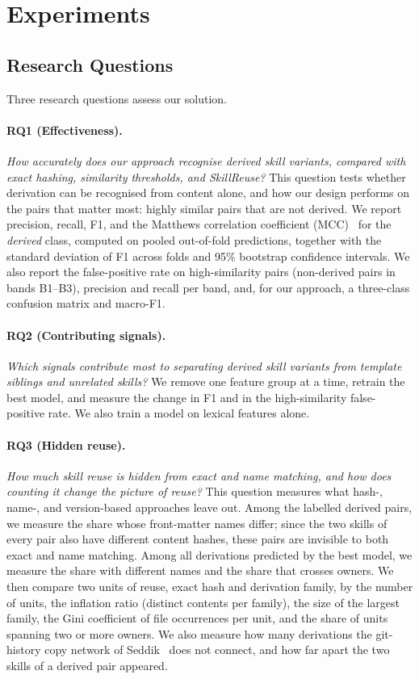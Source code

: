 \documentclass[sigconf,screen]{acmart}
\begin{document}
\section{Experiments}
\label{sec:experiments}

\subsection{Research Questions}

Three research questions assess our solution.

\paragraph{RQ1 (Effectiveness).} \emph{How accurately does our approach recognise derived skill variants, compared with exact hashing, similarity thresholds, and SkillReuse?} This question tests whether derivation can be recognised from content alone, and how our design performs on the pairs that matter most: highly similar pairs that are not derived. We report precision, recall, F1, and the Matthews correlation coefficient (MCC)~\cite{chicco2020mcc} for the \emph{derived} class, computed on pooled out-of-fold predictions, together with the standard deviation of F1 across folds and 95\% bootstrap confidence intervals. We also report the false-positive rate on high-similarity pairs (non-derived pairs in bands B1--B3), precision and recall per band, and, for our approach, a three-class confusion matrix and macro-F1.

\paragraph{RQ2 (Contributing signals).} \emph{Which signals contribute most to separating derived skill variants from template siblings and unrelated skills?} We remove one feature group at a time, retrain the best model, and measure the change in F1 and in the high-similarity false-positive rate. We also train a model on lexical features alone.

\paragraph{RQ3 (Hidden reuse).} \emph{How much skill reuse is hidden from exact and name matching, and how does counting it change the picture of reuse?} This question measures what hash-, name-, and version-based approaches leave out. Among the labelled derived pairs, we measure the share whose front-matter names differ; since the two skills of every pair also have different content hashes, these pairs are invisible to both exact and name matching. Among all derivations predicted by the best model, we measure the share with different names and the share that crosses owners. We then compare two units of reuse, exact hash and derivation family, by the number of units, the inflation ratio (distinct contents per family), the size of the largest family, the Gini coefficient of file occurrences per unit, and the share of units spanning two or more owners. We also measure how many derivations the git-history copy network of Seddik~\cite{seddik2026constellations} does not connect, and how far apart the two skills of a derived pair appeared.
\end{document}
